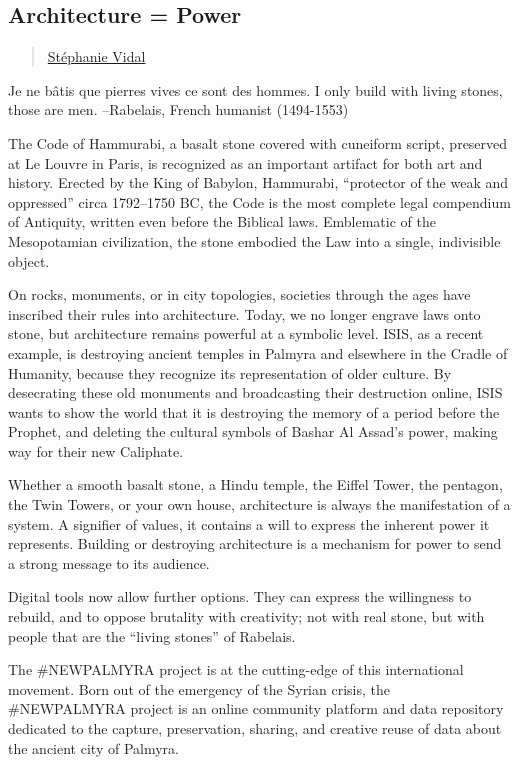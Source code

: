 \subsection{Architecture = Power}\label{architecture-power}

\begin{quote}
\href{../appendix/attributions.html\#stephanie-vidal}{Stéphanie Vidal}
\end{quote}

Je ne bâtis que pierres vives ce sont des hommes. I only build with
living stones, those are men. --Rabelais, French humanist (1494-1553)

The Code of Hammurabi, a basalt stone covered with cuneiform script,
preserved at Le Louvre in Paris, is recognized as an important artifact
for both art and history. Erected by the King of Babylon, Hammurabi,
``protector of the weak and oppressed'' circa 1792--1750 BC, the Code is
the most complete legal compendium of Antiquity, written even before the
Biblical laws. Emblematic of the Mesopotamian civilization, the stone
embodied the Law into a single, indivisible object.

On rocks, monuments, or in city topologies, societies through the ages
have inscribed their rules into architecture. Today, we no longer
engrave laws onto stone, but architecture remains powerful at a symbolic
level. ISIS, as a recent example, is destroying ancient temples in
Palmyra and elsewhere in the Cradle of Humanity, because they recognize
its representation of older culture. By desecrating these old monuments
and broadcasting their destruction online, ISIS wants to show the world
that it is destroying the memory of a period before the Prophet, and
deleting the cultural symbols of Bashar Al Assad's power, making way for
their new Caliphate.

Whether a smooth basalt stone, a Hindu temple, the Eiffel Tower, the
pentagon, the Twin Towers, or your own house, architecture is always the
manifestation of a system. A signifier of values, it contains a will to
express the inherent power it represents. Building or destroying
architecture is a mechanism for power to send a strong message to its
audience.

Digital tools now allow further options. They can express the
willingness to rebuild, and to oppose brutality with creativity; not
with real stone, but with people that are the ``living stones'' of
Rabelais.

The \#NEWPALMYRA project is at the cutting-edge of this international
movement. Born out of the emergency of the Syrian crisis, the
\#NEWPALMYRA project is an online community platform and data repository
dedicated to the capture, preservation, sharing, and creative reuse of
data about the ancient city of Palmyra.

